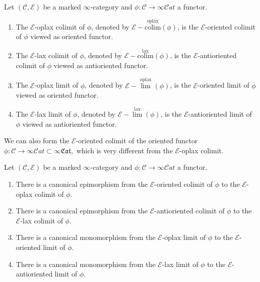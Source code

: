 \documentclass[10pt,oneside]{article}
\numberwithin{equation}{section} %
\numberwithin{figure}{section} %
\theoremstyle{plain}
\theoremstyle{definition}
\newcommand{\mC}{{\mathcal C}}
\newcommand{\mE}{{\mathcal E}}
\newcommand{\colim}{\mathrm{colim}}
\newcommand{\lax}{{\mathrm{lax}}}
\newcommand{\oplax}{{\mathrm{oplax}}}
\newcommand{\scat}{\mathcal{C}\mathit{at}}
\begin{document}
\begin{definition}
Let $(\mC, \mE)$ be a marked $\infty$-category and $\phi: \mC \to \infty\scat$ a functor.

\begin{enumerate}[\normalfont(1)]\setlength{\itemsep}{-2pt}

\item The $\mE$-oplax colimit of $\phi$, denoted by $\mE-\overset{\oplax}{\colim}(\phi)$, is the $\mE$-oriented colimit of $\phi $ viewed as oriented functor.
\item The $\mE$-lax colimit of $\phi$, denoted by $\mE-\overset{\lax}{\colim}(\phi)$, is the $\mE$-antioriented colimit of $\phi $ viewed as antioriented functor.
\item The $\mE$-oplax limit of $\phi$, denoted by $\mE-\overset{\oplax}{\lim}(\phi)$, is the $\mE$-oriented limit of $\phi $ viewed as oriented functor.
\item The $\mE$-lax limit of $\phi$, denoted by $\mE-\overset{\lax}{\lim}(\phi)$, is the $\mE$-antioriented limit of $\phi $ viewed as antioriented functor.

\end{enumerate}

\end{definition}

\begin{remark}

We can also form the $\mE$-oriented colimit of the oriented functor
$\phi: \mC \to \infty\scat \subset \infty\mathfrak{Cat},$
which is very different from the $\mE$-oplax colimit.
  
\end{remark}

\begin{proposition}Let $(\mC, \mE)$ be a marked $\infty$-category and $\phi: \mC \to \infty\scat$ a functor.

\begin{enumerate}[\normalfont(1)]\setlength{\itemsep}{-2pt}
\item There is a canonical epimorphism from the $\mE$-oriented colimit of $\phi$ to the $\mE$-oplax colimit of $\phi.$ 

\item There is a canonical epimorphism from the $\mE$-antioriented colimit of $\phi$ to the $\mE$-lax colimit of $\phi.$

\item There is a canonical monomorphism from the $\mE$-oplax limit of $\phi$ to the $\mE$-oriented limit of $\phi$.

\item There is a canonical monomorphism from the $\mE$-lax limit of $\phi$
to the $\mE$-antioriented limit of $\phi$.

\end{enumerate}
    
\end{proposition}
\end{document}
